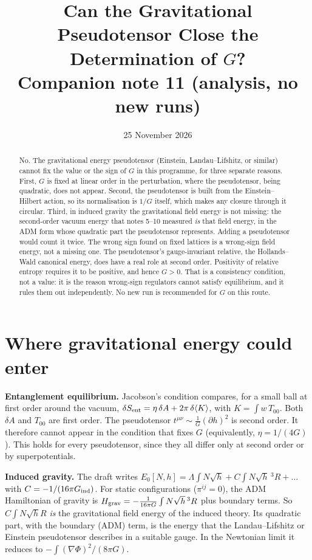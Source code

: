 \documentclass[11pt]{article}
\title{Can the Gravitational Pseudotensor Close the Determination of $G$?\\[4pt]\large Companion note 11 (analysis, no new runs)}
\author{}\date{25 November 2026}
\begin{document}
\maketitle
\begin{abstract}
No. The gravitational energy pseudotensor (Einstein, Landau--Lifshitz, or similar) cannot fix the value or the sign of $G$ in this programme, for three separate reasons. First, $G$ is fixed at linear order in the perturbation, where the pseudotensor, being quadratic, does not appear. Second, the pseudotensor is built from the Einstein--Hilbert action, so its normalisation is $1/G$ itself, which makes any closure through it circular. Third, in induced gravity the gravitational field energy is not missing: the second-order vacuum energy that notes 5--10 measured \emph{is} that field energy, in the ADM form whose quadratic part the pseudotensor represents. Adding a pseudotensor would count it twice. The wrong sign found on fixed lattices is a wrong-sign field energy, not a missing one. The pseudotensor's gauge-invariant relative, the Hollands--Wald canonical energy, does have a real role at second order. Positivity of relative entropy requires it to be positive, and hence $G>0$. That is a consistency condition, not a value: it is the reason wrong-sign regulators cannot satisfy equilibrium, and it rules them out independently. No new run is recommended for $G$ on this route.
\end{abstract}

\section{Where gravitational energy could enter}
\textbf{Entanglement equilibrium.} Jacobson's condition compares, for a small ball at first order around the vacuum,
$\delta S_{\rm ent}=\eta\,\delta A+2\pi\,\delta\langle K\rangle$, with $K=\int w\,T_{00}$. Both $\delta A$ and $T_{00}$ are first order. The pseudotensor $t^{\mu\nu}\sim\frac{1}{G}(\partial h)^2$ is second order. It therefore cannot appear in the condition that fixes $G$ (equivalently, $\eta=1/(4G)$). This holds for every pseudotensor, since they all differ only at second order or by superpotentials.

\textbf{Induced gravity.} The draft writes $E_0[N,h]=\Lambda\int N\sqrt h+C\int N\sqrt h\,{}^3R+\dots$ with $C=-1/(16\pi G_{\rm ind})$. For static configurations ($\pi^{ij}=0$), the ADM Hamiltonian of gravity is $H_{\rm grav}=-\frac{1}{16\pi G}\int N\sqrt h\,{}^3R$ plus boundary terms. So $C\int N\sqrt h R$ \emph{is} the gravitational field energy of the induced theory. Its quadratic part, with the boundary (ADM) term, is the energy that the Landau--Lifshitz or Einstein pseudotensor describes in a suitable gauge. In the Newtonian limit it reduces to $-\int(\nabla\Phi)^2/(8\pi G)$.
\end{document}

